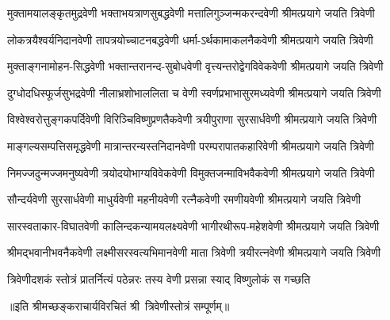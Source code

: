 
\twolineshloka
{मुक्तामयालङ्कृतमुद्रवेणी भक्ताभयत्राणसुबद्धवेणी}
{मत्तालिगुञ्जन्मकरन्दवेणी श्रीमत्प्रयागे जयति त्रिवेणी}%

\twolineshloka
{लोकत्रयैश्वर्यनिदानवेणी तापत्रयोच्चाटनबद्धवेणी}
{धर्मा-ऽर्थकामाकलनैकवेणी श्रीमत्प्रयागे जयति त्रिवेणी}%

\twolineshloka
{मुक्ताङ्गनामोहन-सिद्धवेणी भक्तान्तरानन्द-सुबोधवेणी}
{वृत्त्यन्तरोद्वेगविवेकवेणी श्रीमत्प्रयागे जयति त्रिवेणी}%

\twolineshloka
{दुग्धोदधिस्फूर्जसुभद्रवेणी नीलाभ्रशोभाललिता च वेणी}
{स्वर्णप्रभाभासुरमध्यवेणी श्रीमत्प्रयागे जयति त्रिवेणी}%

\twolineshloka
{विश्वेश्वरोत्तुङ्गकपर्दिवेणी विरिञ्चिविष्णुप्रणतैकवेणी}
{त्रयीपुराणा सुरसार्धवेणी श्रीमत्प्रयागे जयति त्रिवेणी}%

\twolineshloka
{माङ्गल्यसम्पत्तिसमृद्धवेणी मात्रान्तरन्यस्तनिदानवेणी}
{परम्परापातकहारिवेणी श्रीमत्प्रयागे जयति त्रिवेणी}%

\twolineshloka
{निमज्जदुन्मज्जमनुष्यवेणी त्रयोदयोभाग्यविवेकवेणी}
{विमुक्तजन्माविभवैकवेणी श्रीमत्प्रयागे जयति त्रिवेणी}%

\twolineshloka
{सौन्दर्यवेणी सुरसार्धवेणी माधुर्यवेणी महनीयवेणी}
{रत्नैकवेणी रमणीयवेणी श्रीमत्प्रयागे जयति त्रिवेणी}%

\twolineshloka
{सारस्वताकार-विघातवेणी कालिन्दकन्यामयलक्ष्यवेणी}
{भागीरथीरूप-महेशवेणी श्रीमत्प्रयागे जयति त्रिवेणी}%

\twolineshloka
{श्रीमद्भवानीभवनैकवेणी लक्ष्मीसरस्वत्यभिमानवेणी}
{माता त्रिवेणी त्रयीरत्नवेणी श्रीमत्प्रयागे जयति त्रिवेणी}%

\twolineshloka
{त्रिवेणीदशकं स्तोत्रं प्रातर्नित्यं पठेन्नरः}
{तस्य वेणी प्रसन्ना स्याद् विष्णुलोकं स गच्छति}%

॥इति श्रीमच्छङ्कराचार्यविरचितं श्री~त्रिवेणीस्तोत्रं सम्पूर्णम्॥